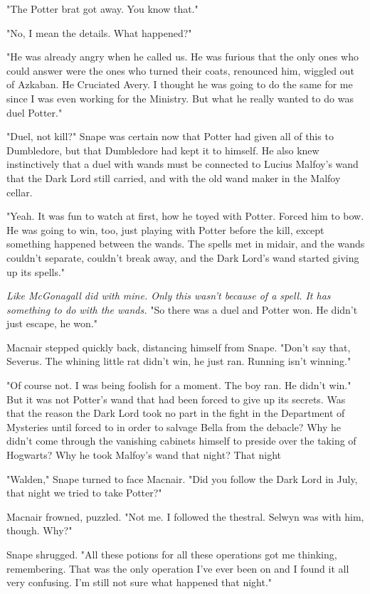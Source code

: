 "The Potter brat got away. You know that."

"No, I mean the details. What happened?"

"He was already angry when he called us. He was furious that the only ones who could answer were the ones who turned their coats, renounced him, wiggled out of Azkaban. He Cruciated Avery. I thought he was going to do the same for me since I was even working for the Ministry. But what he really wanted to do was duel Potter."

"Duel, not kill?" Snape was certain now that Potter had given all of this to Dumbledore, but that Dumbledore had kept it to himself. He also knew instinctively that a duel with wands must be connected to Lucius Malfoy's wand that the Dark Lord still carried, and with the old wand maker in the Malfoy cellar.

"Yeah. It was fun to watch at first, how he toyed with Potter. Forced him to bow. He was going to win, too, just playing with Potter before the kill, except something happened between the wands. The spells met in midair, and the wands couldn't separate, couldn't break away, and the Dark Lord's wand started giving up its spells."

\emph{Like McGonagall did with mine. Only this wasn't because of a spell. It has something to do with the wands.} "So there was a duel and Potter won. He didn't just escape, he won."

Macnair stepped quickly back, distancing himself from Snape. "Don't say that, Severus. The whining little rat didn't win, he just ran. Running isn't winning."

"Of course not. I was being foolish for a moment. The boy ran. He didn't win." But it was not Potter's wand that had been forced to give up its secrets. Was that the reason the Dark Lord took no part in the fight in the Department of Mysteries until forced to in order to salvage Bella from the debacle? Why he didn't come through the vanishing cabinets himself to preside over the taking of Hogwarts? Why he took Malfoy's wand that night{\el}? That night{\el}

"Walden," Snape turned to face Macnair. "Did you follow the Dark Lord in July, that night we tried to take Potter?"

Macnair frowned, puzzled. "Not me. I followed the thestral. Selwyn was with him, though. Why?"

Snape shrugged. "All these potions for all these operations got me thinking, remembering. That was the only operation I've ever been on and I found it all very confusing. I'm still not sure what happened that night."

